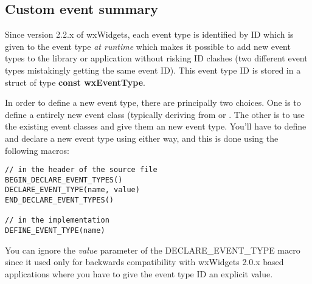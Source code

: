 \begin{twocollist}
\end{twocollist}

\subsection{Custom event summary}\label{customevents}


Since version 2.2.x of wxWidgets, each event type is identified by ID which
is given to the event type {\it at runtime} which makes it possible to add
new event types to the library or application without risking ID clashes
(two different event types mistakingly getting the same event ID). This
event type ID is stored in a struct of type {\bf const wxEventType}.

In order to define a new event type, there are principally two choices.
One is to define a entirely new event class (typically deriving from
 or . 
The other is to use the existing event classes and give them an new event
type. You'll have to define and declare a new event type using either way,
and this is done using the following macros:

\begin{verbatim}
// in the header of the source file
BEGIN_DECLARE_EVENT_TYPES()
DECLARE_EVENT_TYPE(name, value)
END_DECLARE_EVENT_TYPES()

// in the implementation
DEFINE_EVENT_TYPE(name)
\end{verbatim}

You can ignore the {\it value} parameter of the DECLARE\_EVENT\_TYPE macro
since it used only for backwards compatibility with wxWidgets 2.0.x based
applications where you have to give the event type ID an explicit value.

